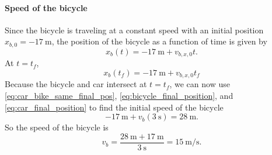 \documentclass{esg8012exam}
\begin{document}
\begin{solution}
    \paragraph{Speed of the bicycle}
      Since the bicycle is traveling at a constant speed with an initial position $x_{b,0} = -\SI{17}{\meter}$, the position of the bicycle as a function of time is given by
      $$x_b(t) = -\SI{17}{\meter} + v_{b,x,0}t.$$
      At $t = t_f$,
      \begin{equation}
        x_b(t_f) = -\SI{17}{\meter} + v_{b,x,0}t_f \label{eq:bicycle_final_position}
      \end{equation}
      Because the bicycle and car intersect at $t = t_f$, we can now use \autoref{eq:car_bike_same_final_pos}, \autoref{eq:bicycle_final_position}, and \autoref{eq:car_final_position} to find the initial speed of the bicycle
      $$-\SI{17}{\meter} + v_b(\SI{3}{\second}) = \SI{28}{\meter}.$$
      So the speed of the bicycle is
      $$v_b = \frac{\SI{28}{\meter} + \SI{17}{\meter}}{\SI{3}{\second}} = \SI{15}{\meter\per\second}.$$
\end{solution}
\end{document}
